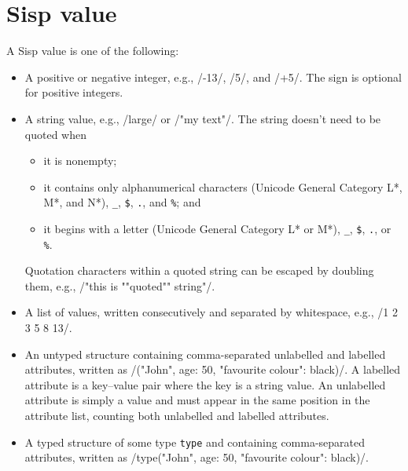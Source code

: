 \documentclass[main.tex]{subfiles}
\begin{document}
\section*{Sisp value}
A Sisp value is one of the following:
\begin{itemize}
	
	\item A positive or negative integer, e.g., \iil/-13/, \iil/5/, and \iil/+5/. The sign is optional for positive integers.
	
	\item A string value, e.g., \iil/large/ or \iil/"my text"/. The string doesn't need to be quoted when
	\begin{itemize}[nosep]
		\item it is nonempty;
		\item it contains only alphanumerical characters (Unicode General Category L*, M*, and N*), \texttt{_}, \texttt{\$}, \texttt{.}, and \texttt{\%}; and
		\item it begins with a letter (Unicode General Category L* or M*), \texttt{_}, \texttt{\$}, \texttt{.}, or \texttt{\%}.
	\end{itemize}
	Quotation characters within a quoted string can be escaped by doubling them, e.g., \iil/"this is ""quoted"" string"/.
	
	\item A list of values, written consecutively and separated by whitespace, e.g., \iil/1 2 3 5 8 13/.
	
	\item An untyped structure containing comma-separated unlabelled and labelled attributes, written as \iil/("John", age: 50, "favourite colour": black)/. A labelled attribute is a key–value pair where the key is a string value. An unlabelled attribute is simply a value and must appear in the same position in the attribute list, counting both unlabelled and labelled attributes.
	
	\item A typed structure of some type \texttt{type} and containing comma-separated attributes, written as \iil/type("John", age: 50, "favourite colour": black)/.
	
\end{itemize}
\end{document}
